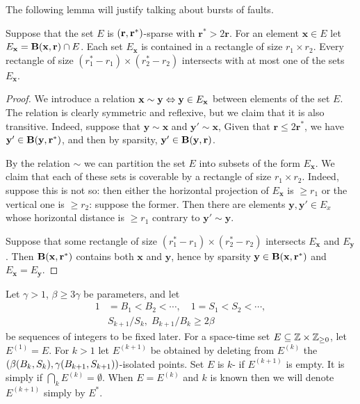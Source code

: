 \documentclass[11pt]{memoir}
\theoremstyle{definition} %
\renewcommand{\le}{\leq}
\renewcommand{\ge}{\geq}
\renewcommand{\vek}[1]{\mathbf{#1}}
\def\B{B}
\renewcommand{\S}{S} %
\renewcommand{\r}{\vek{r}} %
\newcommand{\x}{\vek{x}} %
\newcommand{\y}{\vek{y}} %
\begin{document}
The following lemma will justify talking about bursts of faults.

\begin{lemma}[Bursts]\label{lem:bursts}
  Suppose that the set \( E \) is \( \pair{\r}{\r^{*}} \)-sparse with \( \r^{*}>2\r \).
  For an element \( \x\in E \) let \( E_{\x} = \bB(\x,\r)\cap E \).
  Each set \( E_{\x} \) is contained in a rectangle of size \( r_{1}\times r_{2} \).
  Every rectangle of size \( (r^{*}_{1}-r_{1})\times (r^{*}_{2}-r_{2}) \) intersects
  with at most one of the sets \( E_{\x} \).
\end{lemma}
\begin{proof}
  We introduce a relation \( \x\sim\y \eqv \y\in E_{\x} \) between elements of the set \( E \).
  The relation is clearly symmetric and reflexive, but we claim that it is also transitive.
  Indeed, suppose that \( \y\sim \x \) and \( \y'\sim\x \),
  Given that \( \r\le 2\r^{*} \), we have \( \y'\in \bB(\y,\r^{*}) \),
  and then by sparsity, \( \y'\in \bB(\y,\r) \).

  By the relation \( \sim \) we can partition the set \( E \)
  into subsets of the form \( E_{\x} \).
  We claim that each of these sets is coverable by a rectangle of size \( r_{1}\times r_{2} \).
  Indeed, suppose this is not so: then either the horizontal projection of \( E_{\x} \)
  is \( \ge r_{1} \) or the vertical one is \( \ge r_{2} \): suppose the former.
  Then there are elements \( \y,\y'\in E_{x} \) whose horizontal distance is \( \ge r_{1} \)
  contrary to \( \y'\sim\y \).

  Suppose that some rectangle of size \( (r^{*}_{1}-r_{1})\times (r^{*}_{2}-r_{2}) \) intersects
  \( E_{\x} \) and \( E_{\y} \).
  Then \( \bB(\x,\r^{*}) \) contains both \( \x \) and \( \y \), hence by sparsity \( \y\in \bB(\x,\r^{*}) \)
and \( E_{\x}=E_{\y} \).
\end{proof}

\begin{definition}\label{def:sparsity}
Let \( \gamma> 1 \), \( \beta \ge 3\gamma \) be parameters, and let
  \begin{align*}
  1 &=\B_{1}<\B_{2}<\dotsm,\quad
  1=\S_{1}<\S_{2}<\dotsm,
\\ &\S_{k+1}/\S_{k},\; \B_{k+1}/\B_{k}\ge 2\beta
\end{align*}
be sequences of integers to be fixed later.
For a space-time set \( E\subseteq\bbZ\times\bbZ_{\ge 0} \), let \( E^{(1)} = E \).
For \( k>1 \) let \( E^{(k+1)} \) be obtained by deleting from \( E^{(k)} \) the
\( \pair{\beta\pair{\B_{k}}{\S_{k}}}{\gamma\pair{\B_{k+1}}{\S_{k+1}}} \)-isolated points.
Set \( E \) is \( k \)- if \( E^{(k+1)} \) is empty.
It is simply  if \( \bigcap_{k}E^{(k)}=\emptyset \).
When \( E=E^{(k)} \) and \( k \) is known
then we will denote \( E^{(k+1)} \) simply by \( E^{*} \).
\end{definition}
\end{document}
